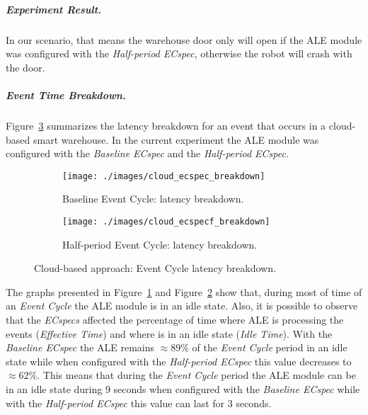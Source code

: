 \subparagraph{Experiment Result.}
\label{subp:cloud_experiment_result}
In our scenario, that means the warehouse door only will open if the \gls{ALE} module was configured
with the \textit{Half-period ECspec}, otherwise the robot will crash with the door.

\subparagraph{Event Time Breakdown.}
\label{subp:cloud_event_breakdown}
Figure~\ref{fig:ecspecf_breakdown} summarizes the latency breakdown for an event that occurs in a cloud-based
smart warehouse. In the current experiment the \gls{ALE} module was configured with the
\textit{Baseline ECspec} and the \textit{Half-period ECspec}.\\

\begin{figure}[ht!]
  \centering
  \begin{subfigure}{.5\textwidth}
    \centering
    \texttt{[image: ./images/cloud\_ecspec\_breakdown]}
    \caption{Baseline Event Cycle: latency breakdown.}
    \label{fig:ecspecf_base}
  \end{subfigure}%
  \begin{subfigure}{.5\textwidth}
    \centering
    \texttt{[image: ./images/cloud\_ecspecf\_breakdown]}
    \caption{Half-period Event Cycle: latency breakdown.}
    \label{fig:ecspecf_half}
  \end{subfigure}
  \caption[Cloud-based approach: event latency breakdown.]{Cloud-based approach: Event Cycle latency breakdown.}
  \label{fig:ecspecf_breakdown}
\end{figure}

The graphs presented in Figure~\ref{fig:ecspecf_base} and Figure~\ref{fig:ecspecf_half} show that,
during most of time of an \textit{Event Cycle} the \gls{ALE} module is in an idle state.
Also, it is possible to observe that the \textit{ECspecs} affected the percentage of time where
\gls{ALE} is processing the events (\textit{Effective Time}) and where is in an idle state (\textit{Idle Time}).
With the \textit{Baseline ECspec} the \gls{ALE} remains $\approx89\%$ of the \textit{Event Cycle} period
in an idle state while when configured with the \textit{Half-period ECspec} this value decreases to
$\approx62\%$. This means that during the \textit{Event Cycle} period the \gls{ALE} module can be in
an idle state during 9 seconds when configured with the \textit{Baseline ECspec} while with the
\textit{Half-period ECspec} this value can last for 3 seconds.

